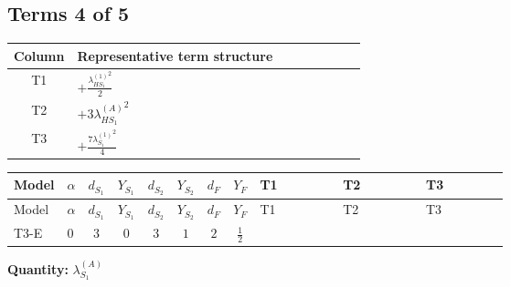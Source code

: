\documentclass[8pt]{article}
\begin{document}
\begin{landscape}
\subsection*{Terms 4 of 5}
\begin{center}
\begin{tabular}{@{}c >{\raggedright\arraybackslash}p{0.82\linewidth}@{}}
\toprule
Column & Representative term structure \\
\midrule
T1 & \(\displaystyle +\frac{{\lambda_{HS_1}^{(1)}}^2}{2}\) \\
\midrule
T2 & \(\displaystyle +3 {\lambda_{HS_1}^{(A)}}^2\) \\
\midrule
T3 & \(\displaystyle +\frac{7 {\lambda_{S_1}^{(1)}}^2}{4}\) \\
\midrule
\bottomrule
\end{tabular}
\end{center}
\smallskip
\tiny
\begin{longtable}{@{}llcccccc >{\raggedright\arraybackslash}p{0.21\linewidth} >{\raggedright\arraybackslash}p{0.21\linewidth} >{\raggedright\arraybackslash}p{0.21\linewidth}@{}}
\toprule
Model & $\alpha$ & $d_{S_1}$ & $Y_{S_1}$ & $d_{S_2}$ & $Y_{S_2}$ & $d_F$ & $Y_F$ & T1 & T2 & T3 \\
\midrule
\endfirsthead
\toprule
Model & $\alpha$ & $d_{S_1}$ & $Y_{S_1}$ & $d_{S_2}$ & $Y_{S_2}$ & $d_F$ & $Y_F$ & T1 & T2 & T3 \\
\midrule
\endhead
T3-E & $0$ & $3$ & $0$ & $3$ & $1$ & $2$ & $\frac{1}{2}$ & \scriptsize\adjustbox{max width=\linewidth}{$\begin{gathered} +\frac{{\lambda_{HS_1}^{(1)}}^2}{2}\end{gathered}$} & \scriptsize\adjustbox{max width=\linewidth}{$\begin{gathered} +3 {\lambda_{HS_1}^{(A)}}^2\end{gathered}$} & \scriptsize\adjustbox{max width=\linewidth}{$\begin{gathered} +\frac{7 {\lambda_{S_1}^{(1)}}^2}{4}\end{gathered}$} \\
\midrule
\bottomrule
\end{longtable}
\clearpage
\noindent\textbf{Quantity: }$\lambda_{S_1}^{(A)}$\par\smallskip

\end{landscape}
\end{document}
